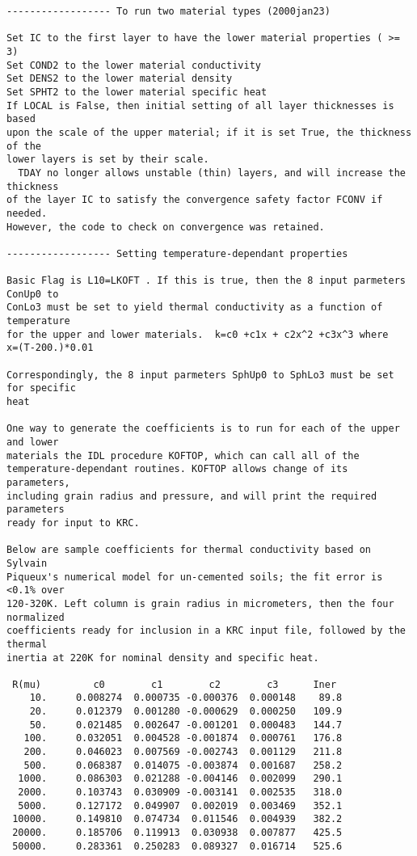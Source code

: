 \begin{verbatim}
------------------ To run two material types (2000jan23)

Set IC to the first layer to have the lower material properties ( >= 3)
Set COND2 to the lower material conductivity
Set DENS2 to the lower material density
Set SPHT2 to the lower material specific heat
If LOCAL is False, then initial setting of all layer thicknesses is based
upon the scale of the upper material; if it is set True, the thickness of the
lower layers is set by their scale.
  TDAY no longer allows unstable (thin) layers, and will increase the thickness
of the layer IC to satisfy the convergence safety factor FCONV if needed. 
However, the code to check on convergence was retained.

------------------ Setting temperature-dependant properties

Basic Flag is L10=LKOFT . If this is true, then the 8 input parmeters ConUp0 to
ConLo3 must be set to yield thermal conductivity as a function of temperature
for the upper and lower materials.  k=c0 +c1x + c2x^2 +c3x^3 where
x=(T-200.)*0.01 

Correspondingly, the 8 input parmeters SphUp0 to SphLo3 must be set for specific
heat
 
One way to generate the coefficients is to run for each of the upper and lower
materials the IDL procedure KOFTOP, which can call all of the
temperature-dependant routines. KOFTOP allows change of its parameters,
including grain radius and pressure, and will print the required parameters
ready for input to KRC.

Below are sample coefficients for thermal conductivity based on Sylvain
Piqueux's numerical model for un-cemented soils; the fit error is <0.1% over
120-320K. Left column is grain radius in micrometers, then the four normalized
coefficients ready for inclusion in a KRC input file, followed by the thermal
inertia at 220K for nominal density and specific heat.

 R(mu)         c0        c1        c2        c3      Iner  
    10.     0.008274  0.000735 -0.000376  0.000148    89.8 
    20.     0.012379  0.001280 -0.000629  0.000250   109.9 
    50.     0.021485  0.002647 -0.001201  0.000483   144.7 
   100.     0.032051  0.004528 -0.001874  0.000761   176.8 
   200.     0.046023  0.007569 -0.002743  0.001129   211.8 
   500.     0.068387  0.014075 -0.003874  0.001687   258.2 
  1000.     0.086303  0.021288 -0.004146  0.002099   290.1 
  2000.     0.103743  0.030909 -0.003141  0.002535   318.0 
  5000.     0.127172  0.049907  0.002019  0.003469   352.1 
 10000.     0.149810  0.074734  0.011546  0.004939   382.2 
 20000.     0.185706  0.119913  0.030938  0.007877   425.5 
 50000.     0.283361  0.250283  0.089327  0.016714   525.6 




\end{verbatim}
